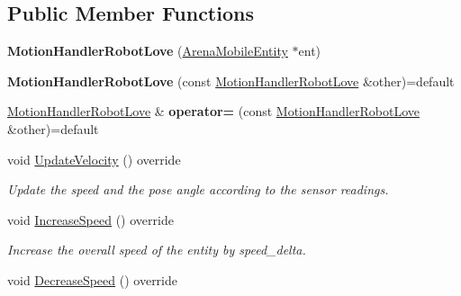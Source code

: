 \subsection*{Public Member Functions}
\begin{DoxyCompactItemize}
\item 
{\bfseries Motion\+Handler\+Robot\+Love} (\hyperlink{classArenaMobileEntity}{Arena\+Mobile\+Entity} $\ast$ent)\hypertarget{classMotionHandlerRobotLove_aa2e0d7f03281a230f095d825ab2b35c6}{}\label{classMotionHandlerRobotLove_aa2e0d7f03281a230f095d825ab2b35c6}

\item 
{\bfseries Motion\+Handler\+Robot\+Love} (const \hyperlink{classMotionHandlerRobotLove}{Motion\+Handler\+Robot\+Love} \&other)=default\hypertarget{classMotionHandlerRobotLove_a547d8a567954d2b82ef8e5f30f1c9515}{}\label{classMotionHandlerRobotLove_a547d8a567954d2b82ef8e5f30f1c9515}

\item 
\hyperlink{classMotionHandlerRobotLove}{Motion\+Handler\+Robot\+Love} \& {\bfseries operator=} (const \hyperlink{classMotionHandlerRobotLove}{Motion\+Handler\+Robot\+Love} \&other)=default\hypertarget{classMotionHandlerRobotLove_a5a281795ebc5df70d5529fc012bc4aa5}{}\label{classMotionHandlerRobotLove_a5a281795ebc5df70d5529fc012bc4aa5}

\item 
void \hyperlink{classMotionHandlerRobotLove_a3d4030e29ee33bbd4cddfc9850543615}{Update\+Velocity} () override\hypertarget{classMotionHandlerRobotLove_a3d4030e29ee33bbd4cddfc9850543615}{}\label{classMotionHandlerRobotLove_a3d4030e29ee33bbd4cddfc9850543615}

\begin{DoxyCompactList}\small\item\em Update the speed and the pose angle according to the sensor readings. \end{DoxyCompactList}\item 
void \hyperlink{classMotionHandlerRobotLove_ac4b0287075f1ec75e9b1bb776eb428f6}{Increase\+Speed} () override\hypertarget{classMotionHandlerRobotLove_ac4b0287075f1ec75e9b1bb776eb428f6}{}\label{classMotionHandlerRobotLove_ac4b0287075f1ec75e9b1bb776eb428f6}

\begin{DoxyCompactList}\small\item\em Increase the overall speed of the entity by speed\+\_\+delta. \end{DoxyCompactList}\item 
void \hyperlink{classMotionHandlerRobotLove_af64d850f198beaccdc9dad1a519c387c}{Decrease\+Speed} () override\hypertarget{classMotionHandlerRobotLove_af64d850f198beaccdc9dad1a519c387c}{}\label{classMotionHandlerRobotLove_af64d850f198beaccdc9dad1a519c387c}


\end{DoxyCompactItemize}
